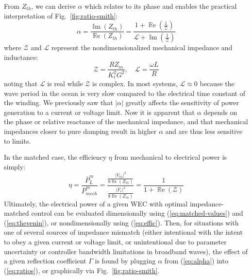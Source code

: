 \documentclass{ifacconf}
\renewcommand{\Re}{\operatorname{\mathbb{R}e}}
\renewcommand{\Im}{\operatorname{\mathbb{I}m}}
\begin{document}
From $Z_{th}$, we can derive $\alpha$ which relates to its phase and enables the practical interpretation of Fig.~\ref{fig:ratio-smith}:
\begin{equation}\label{eq:alpha}
    \alpha = \frac{\Im(Z_{th})}{\Re(Z_{th})} =  \frac{1+\Re(\frac{1}{\mathcal{Z}})}{\mathcal{L} + \Im(\frac{1}{\mathcal{Z}})}
\end{equation}
where $\mathcal{Z}$ and $\mathcal{L}$ represent the nondimensionalized mechanical impedance and inductance:
\begin{equation}
    \mathcal{Z} = \frac{RZ_m}{K_t^2G^2}, \quad
    \mathcal{L} = \frac{\omega L}{ R }
\end{equation}
noting that $\mathcal{L}$ is real while $\mathcal{Z}$ is complex. In most systems, $\mathcal{L} \approx 0$ because the wave period in the ocean is very slow compared to the electrical time constant of the winding. We previously saw that $|\alpha|$ greatly affects the sensitivity of power generation to a current or voltage limit. Now it is apparent that $\alpha$ depends on the phase or relative reactance of the mechanical impedance, and that mechanical impedances closer to pure damping result in higher $\alpha$ and are thus less sensitive to limits.

In the matched case, the efficiency $\eta$ from mechanical to electrical power is simply:
\begin{equation}\label{eq:effic}
    \eta = \frac{\overline{P}_L^m}{\overline{P}_{mech}^m} = \frac{\frac{|V_{th}|^2}{8 \Re(Z_{th})}}{\frac{|F_{e}|^2}{8 \Re(Z_{m})}} = \frac{1}{1 + \Re(\mathcal{Z})}
\end{equation}
Ultimately, the electrical power of a given WEC with optimal impedance-matched control can be evaluated dimensionally using (\ref{eq:matched-values}) and (\ref{eq:thevenin}), or nondimensionally using (\ref{eq:effic}). Then, for situations with one of several sources of impedance mismatch (either intentional with the intent to obey a given current or voltage limit, or unintentional due to parameter uncertainty or controller bandwidth limitations in broadband waves), the effect of a given reflection coefficient $\Gamma$ is found by plugging $\alpha$ from (\ref{eq:alpha}) into (\ref{eq:ratios}), or graphically via Fig.~\ref{fig:ratio-smith}.
\end{document}
